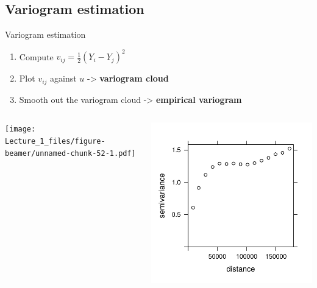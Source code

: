 \documentclass[
  ignorenonframetext,
]{beamer}
\providecommand{\tightlist}{%
  \setlength{\itemsep}{0pt}\setlength{\parskip}{0pt}}
\begin{document}
\hypertarget{variogram-estimation}{%
\subsection{Variogram estimation}\label{variogram-estimation}}

\begin{frame}{Variogram estimation}
\small

\begin{enumerate}
\tightlist
\item
  Compute \(v_{ij}=\frac{1}{2}\left(Y_i-Y_j\right)^2\)
\item
  Plot \(v_{ij}\) against \(u\) -\textgreater{} \textbf{variogram cloud}
\item
  Smooth out the variogram cloud -\textgreater{} \textbf{empirical
  variogram}
\end{enumerate}

\begin{columns}[T]
\begin{column}{0.48\textwidth}
\texttt{[image: Lecture\_1\_files/figure-beamer/unnamed-chunk-52-1.pdf]}
\end{column}

\begin{column}{0.48\textwidth}
\includegraphics{Lecture_1_files/figure-beamer/unnamed-chunk-53-1.pdf}
\end{column}
\end{columns}
\end{frame}
\end{document}
